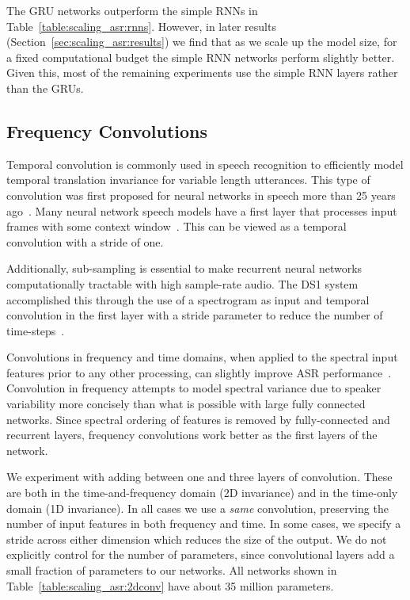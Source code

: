 The GRU networks outperform the simple RNNs in
Table~\ref{table:scaling_asr:rnns}. However, in later results
(Section~\ref{sec:scaling_asr:results}) we find that as we scale up the model
size, for a fixed computational budget the simple RNN networks perform slightly
better.  Given this, most of the remaining experiments use the simple RNN
layers rather than the GRUs.

\subsection{Frequency Convolutions}
\label{sec:scaling_asr:2dconv}

Temporal convolution is commonly used in speech recognition to efficiently
model temporal translation invariance for variable length utterances. This type
of convolution was first proposed for neural networks in speech more than 25
years ago~\cite{waibel1989}. Many neural network speech models have a first
layer that processes input frames with some context window~\cite{dahl2011,
vesely2013}. This can be viewed as a temporal convolution with a stride of one. 

Additionally, sub-sampling is essential to make recurrent neural networks
computationally tractable with high sample-rate audio. The DS1 system
accomplished this through the use of a spectrogram as input and temporal
convolution in the first layer with a stride parameter to reduce the number of
time-steps~\cite{hannun2014deepspeech}.

Convolutions in frequency and time domains, when applied to the spectral input
features prior to any other processing, can slightly improve ASR
performance~\cite{abdelhamid2012, sainath2013deep, soltau2014}. Convolution in
frequency attempts to model spectral variance due to speaker variability more
concisely than what is possible with large fully connected networks. Since
spectral ordering of features is removed by fully-connected and recurrent
layers, frequency convolutions work better as the first layers of the network.

We experiment with adding between one and three layers of convolution. These
are both in the time-and-frequency domain (2D invariance) and in the time-only
domain (1D invariance). In all cases we use a \emph{same} convolution,
preserving the number of input features in both frequency and time. In some
cases, we specify a stride across either dimension which reduces the size of
the output. We do not explicitly control for the number of parameters, since
convolutional layers add a small fraction of parameters to our networks. All
networks shown in Table~\ref{table:scaling_asr:2dconv} have about 35 million
parameters.

